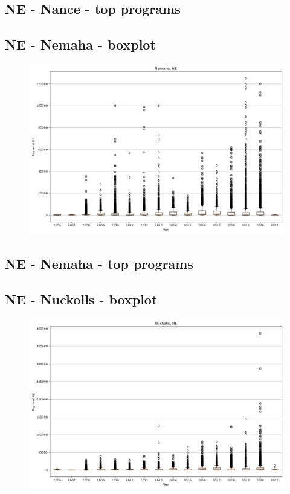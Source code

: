 \subsection*{NE - Nance - top programs}

\newpage
\subsection*{NE - Nemaha - boxplot}
\begin{figure}[h]
\centering
\includegraphics[width=7in]{../output/boxplots/counties/Nemaha-NE_boxplot.png}
\end{figure}


\subsection*{NE - Nemaha - top programs}

\newpage
\subsection*{NE - Nuckolls - boxplot}
\begin{figure}[h]
\centering
\includegraphics[width=7in]{../output/boxplots/counties/Nuckolls-NE_boxplot.png}
\end{figure}



